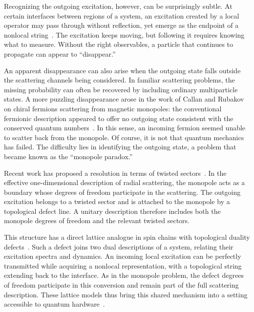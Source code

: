 \documentclass[aps,floatfix,10pt,amssymb,amsfont,amsmath,superscriptaddress,float,nofootinbib,longbibliography,nobalancelastpage,twocolumn]{revtex4-2}
\begin{document}
Recognizing the outgoing excitation, however, can be surprisingly subtle. At certain interfaces between regions of a system, an excitation created by a local operator may pass through without reflection, yet emerge as the endpoint of a nonlocal string~\cite{ueda2025}. The excitation keeps moving, but following it requires knowing what to measure. Without the right observables, a particle that continues to propagate can appear to ``disappear.''

An apparent disappearance can also arise when the outgoing state falls outside the scattering channels being considered. In familiar scattering problems, the missing probability can often be recovered by including ordinary multiparticle states. A more puzzling disappearance arose in the work of Callan and Rubakov on chiral fermions scattering from magnetic monopoles: the conventional fermionic description appeared to offer no outgoing state consistent with the conserved quantum numbers~\cite{Callan:1982ah,Rubakov:1982fp,Polchinski:fermion_rotor}. In this sense, an incoming fermion seemed unable to scatter back from the monopole. Of course, it is not that quantum mechanics
has failed. The difficulty lies in identifying the outgoing state, a problem that became known as the “monopole paradox.”

Recent work has proposed a resolution in terms of twisted sectors~\cite{van_beest_fermion-monopole_2024,van_beest_monopoles_2025,loladze_monopole-fermion_2025,loladze_dynamics_2025}. In the effective one-dimensional description of radial scattering, the monopole acts as a boundary whose degrees of freedom participate in the scattering. The outgoing excitation belongs to a twisted sector and is attached to the monopole by a topological defect line. A unitary description therefore includes both the monopole degrees of freedom and the relevant twisted sectors.

This structure has a direct lattice analogue in spin chains with topological duality defects~\cite{ueda2025,Ueda:2026wvc,aasen2016topological}. Such a defect joins two dual descriptions of a system, relating their excitation spectra and dynamics. An incoming local excitation can be perfectly transmitted while acquiring a nonlocal representation, with a topological string extending back to the interface. As in the monopole problem, the defect degrees of freedom participate in this conversion and remain part of the full scattering description. These lattice models thus bring this shared mechanism into a setting accessible to quantum hardware~\cite{samanta2025dualitytwist}.
\end{document}
